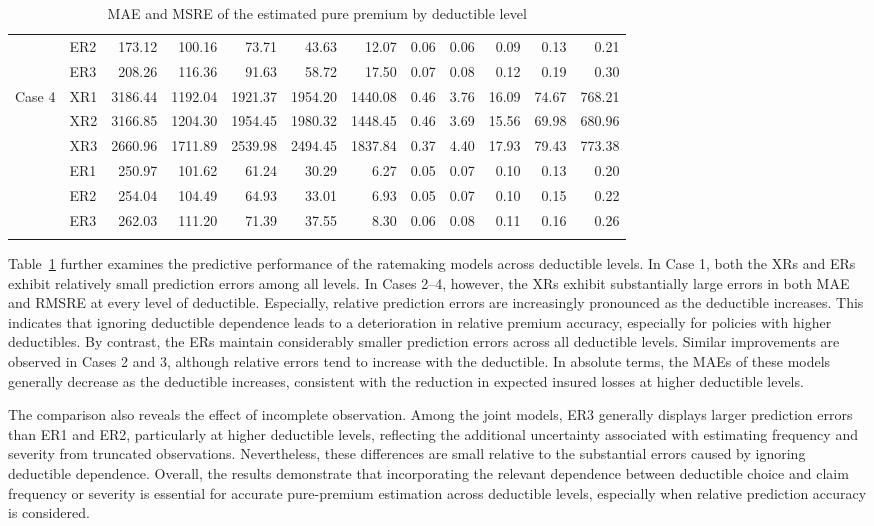 \documentclass[11pt]{article}
\begin{document}
{\begin{table}[h!]
\begin{tabular}{llrrrrrrrrrr}
 & ER2 & 173.12 & 100.16 & 73.71 & 43.63 & 12.07 & 0.06 & 0.06 & 0.09 & 0.13 & 0.21 \\
 & ER3 & 208.26 & 116.36 & 91.63 & 58.72 & 17.50 & 0.07 & 0.08 & 0.12 & 0.19 & 0.30 \\
\midrule
\multirow{6}{*}{Case 4} & XR1 & 3186.44 & 1192.04 & 1921.37 & 1954.20 & 1440.08 & 0.46 & 3.76 & 16.09 & 74.67 & 768.21 \\
 & XR2 & 3166.85 & 1204.30 & 1954.45 & 1980.32 & 1448.45 & 0.46 & 3.69 & 15.56 & 69.98 & 680.96 \\
 & XR3 & 2660.96 & 1711.89 & 2539.98 & 2494.45 & 1837.84 & 0.37 & 4.40 & 17.93 & 79.43 & 773.38 \\
 & ER1 & 250.97 & 101.62 & 61.24 & 30.29 & 6.27 & 0.05 & 0.07 & 0.10 & 0.13 & 0.20 \\
 & ER2 & 254.04 & 104.49 & 64.93 & 33.01 & 6.93 & 0.05 & 0.07 & 0.10 & 0.15 & 0.22 \\
 & ER3 & 262.03 & 111.20 & 71.39 & 37.55 & 8.30 & 0.06 & 0.08 & 0.11 & 0.16 & 0.26 \\ 
\hhline{============}
\end{tabular}
\caption{MAE and MSRE of the estimated pure premium by deductible level}
\label{tab:simSbylevel}
\end{table}

Table~\ref{tab:simSbylevel} further examines the predictive performance of the ratemaking models across deductible levels. In Case 1, both the XRs and ERs exhibit relatively small prediction errors among all levels. In Cases 2--4, however, the XRs exhibit substantially large errors in both MAE and RMSRE at every level of deductible. Especially, relative prediction errors are increasingly pronounced as the deductible increases. This indicates that ignoring deductible dependence leads to a deterioration in relative premium accuracy, especially for policies with higher deductibles. By contrast, the ERs maintain considerably smaller prediction errors across all deductible levels. Similar improvements are observed in Cases 2 and 3, although relative errors tend to increase with the deductible. In absolute terms, the MAEs of these models generally decrease as the deductible increases, consistent with the reduction in expected insured losses at higher deductible levels.

The comparison also reveals the effect of incomplete observation. Among the joint models, ER3 generally displays larger prediction errors than ER1 and ER2, particularly at higher deductible levels, reflecting the additional uncertainty associated with estimating frequency and severity from truncated observations. Nevertheless, these differences are small relative to the substantial errors caused by ignoring deductible dependence. Overall, the results demonstrate that incorporating the relevant dependence between deductible choice and claim frequency or severity is essential for accurate pure-premium estimation across deductible levels, especially when relative prediction accuracy is considered.

}
\end{document}
